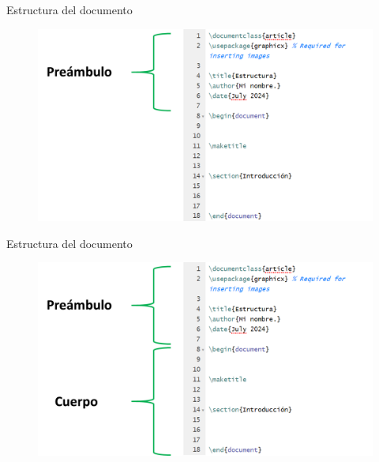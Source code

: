 \documentclass[aspectratio=169, 10pt]{beamer}
\begin{document}
\begin{frame}[fragile]{Estructura del documento}

\begin{figure}
    \centering
    \includegraphics[scale=0.32]{Estructura2.png} 
    \label{fig:enter-label}
\end{figure}
\end{frame}

\begin{frame}[fragile]{Estructura del documento}

\begin{figure}
    \centering
    \includegraphics[scale=0.32]{Estructura3.png} 
    \label{fig:enter-label}
\end{figure}
\end{frame}
\end{document}
